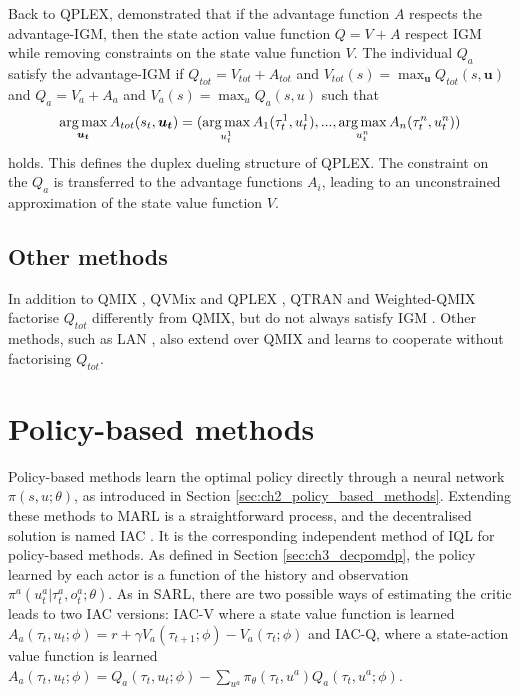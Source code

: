Back to QPLEX, \citet{wang2021qplex} demonstrated that if the advantage function $A$ respects the advantage-IGM, then the state action value function $Q = V + A$ respect IGM while removing constraints on the state value function $V$.
The individual $Q_a$ satisfy the advantage-IGM if $Q_{tot}=V_{tot}+A_{tot}$ and $V_{tot}(s)=\max_{\mathbf{u}} Q_{tot}(s, \mathbf{u})$ and $Q_a=V_a+A_a$ and $V_a(s)=\max_{u} Q_a(s, u)$ such that 
\begin{equation}
    \argmax_{\mathbf{u_t}} A_{tot}(s_t, \mathbf{u_t}) =(\argmax_{u_t^{1}} A_{1}(\tau_t^{1}, u_t^{1}),...,\argmax_{u_t^{n}} A_{n}(\tau_t^{n}, u_t^{n}))    \label{eq:ch3_adv_igm}
\end{equation}
holds.
This defines the duplex dueling structure of QPLEX.
The constraint on the $Q_a$ is transferred to the advantage functions $A_i$, leading to an unconstrained approximation of the state value function $V$.

\subsection{Other methods}
In addition to QMIX \citep{Rashid2018}, QVMix \citep{leroy2020qvmix} and QPLEX \citep{wang2021qplex}, QTRAN \citep{Son2019QTRAN:Learning} and Weighted-QMIX \citep{rashid2020weighted} factorise $Q_{tot}$ differently from QMIX, but do not always satisfy IGM \citep{Son2019QTRAN:Learning}.
Other methods, such as LAN \citep{avalos2023local}, also extend over QMIX and learns to cooperate without factorising $Q_{tot}$.

\section{Policy-based methods}
\label{sec:ch3_policy}
Policy-based methods learn the optimal policy directly through a neural network $\pi(s, u;\theta)$, as introduced in Section \ref{sec:ch2_policy_based_methods}.
Extending these methods to MARL is a straightforward process, and the decentralised solution is named IAC \citep{Foerster2017}. 
It is the corresponding independent method of IQL for policy-based methods.
As defined in Section \ref{sec:ch3_decpomdp}, the policy learned by each actor is a function of the history and observation $\pi^{a}(u_t^{a}|\tau_t^{a},o_t^{a};\theta)$.
As in SARL, there are two possible ways of estimating the critic leads to two IAC versions: IAC-V where a state value function is learned $A_a(\tau_t, u_t; \phi) = r + \gamma V_a(\tau_{t+1}; \phi) - V_a(\tau_t; \phi)$ and IAC-Q, where a state-action value function is learned $A_a(\tau_t, u_t; \phi) = Q_a(\tau_t, u_t; \phi) - \sum_{u^a}\pi_\theta(\tau_t, u^a)Q_a(\tau_t, u^a; \phi)$.

